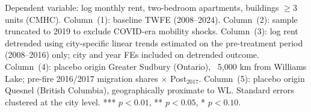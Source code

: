 \begin{table}[htbp]
   \par \raggedright 
   Dependent variable: log monthly rent, two-bedroom apartments, buildings $\geq 3$ units (CMHC). Column~(1): baseline TWFE (2008--2024). Column~(2): sample truncated to 2019 to exclude COVID-era mobility shocks. Column~(3): log rent detrended using city-specific linear trends estimated on the pre-treatment period (2008--2016) only; city and year FEs included on detrended outcome. Column~(4): placebo origin Greater Sudbury (Ontario), ~5,000 km from Williams Lake; pre-fire 2016/2017 migration shares $\times$ Post$_{2017}$. Column~(5): placebo origin Quesnel (British Columbia), geographically proximate to WL. Standard errors clustered at the city level. *** $p<0.01$, ** $p<0.05$, * $p<0.10$.
\end{table}


